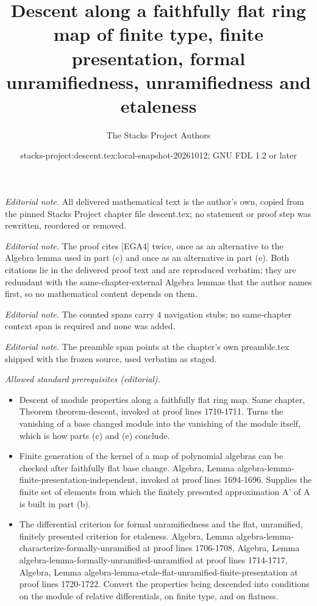 \documentclass{stacks-project}
\title{Descent along a faithfully flat ring map of finite type, finite presentation, formal unramifiedness, unramifiedness and etaleness}
\author{The Stacks Project Authors}
\date{stacks-project:descent.tex:local-snapshot-20261012; GNU FDL 1.2 or later}
\theoremstyle{plain}
\theoremstyle{definition}
\theoremstyle{remark}
\numberwithin{equation}{subsection}
\begin{document}
\maketitle
\noindent\textit{Editorial note.} All delivered mathematical text is the author's own, copied from the pinned Stacks Project chapter file descent.tex; no statement or proof step was rewritten, reordered or removed.\par\medskip
\noindent\textit{Editorial note.} The proof cites [EGA4] twice, once as an alternative to the Algebra lemma used in part (c) and once as an alternative in part (e). Both citations lie in the delivered proof text and are reproduced verbatim; they are redundant with the same-chapter-external Algebra lemmas that the author names first, so no mathematical content depends on them.\par\medskip
\noindent\textit{Editorial note.} The counted spans carry 4 navigation stubs; no same-chapter context span is required and none was added.\par\medskip
\noindent\textit{Editorial note.} The preamble span points at the chapter's own preamble.tex shipped with the frozen source, used verbatim as staged.\par\medskip
\noindent\textit{Allowed standard prerequisites (editorial).}\begin{itemize}
\item Descent of module properties along a faithfully flat ring map. Same chapter, Theorem theorem-descent, invoked at proof lines 1710-1711. Turns the vanishing of a base changed module into the vanishing of the module itself, which is how parts (c) and (e) conclude.
\item Finite generation of the kernel of a map of polynomial algebras can be checked after faithfully flat base change. Algebra, Lemma algebra-lemma-finite-presentation-independent, invoked at proof lines 1694-1696. Supplies the finite set of elements from which the finitely presented approximation A' of A is built in part (b).
\item The differential criterion for formal unramifiedness and the flat, unramified, finitely presented criterion for etaleness. Algebra, Lemma algebra-lemma-characterize-formally-unramified at proof lines 1706-1708, Algebra, Lemma algebra-lemma-formally-unramified-unramified at proof lines 1714-1717, Algebra, Lemma algebra-lemma-etale-flat-unramified-finite-presentation at proof lines 1720-1722. Convert the properties being descended into conditions on the module of relative differentials, on finite type, and on flatness.
\end{itemize}\medskip
\end{document}
